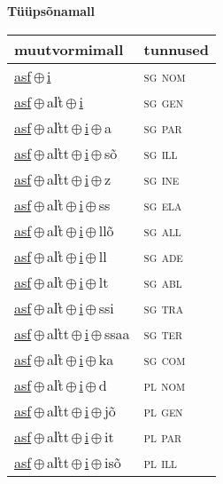 

\vspace{3.5em}
\noindent \begin{minipage}{\textwidth}
\noindent \textbf{Tüüpsõnamall \,}\\

\begin{sideways}
\begin{tabular}{l l}
muutvormimall & tunnused \\
\hline
\underline{asf}\,$\oplus$\,\underline{i} & \textsc{ sg nom } \\
\underline{asf}\,$\oplus$\,al̕t\,$\oplus$\,\underline{i} & \textsc{ sg gen } \\
\underline{asf}\,$\oplus$\,al̕tt\,$\oplus$\,\underline{i}\,$\oplus$\,a & \textsc{ sg par } \\
\underline{asf}\,$\oplus$\,al̕tt\,$\oplus$\,\underline{i}\,$\oplus$\,sõ & \textsc{ sg ill } \\
\underline{asf}\,$\oplus$\,al̕tt\,$\oplus$\,\underline{i}\,$\oplus$\,z & \textsc{ sg ine } \\
\underline{asf}\,$\oplus$\,al̕t\,$\oplus$\,\underline{i}\,$\oplus$\,ss & \textsc{ sg ela } \\
\underline{asf}\,$\oplus$\,al̕t\,$\oplus$\,\underline{i}\,$\oplus$\,llõ & \textsc{ sg all } \\
\underline{asf}\,$\oplus$\,al̕t\,$\oplus$\,\underline{i}\,$\oplus$\,ll & \textsc{ sg ade } \\
\underline{asf}\,$\oplus$\,al̕t\,$\oplus$\,\underline{i}\,$\oplus$\,lt & \textsc{ sg abl } \\
\underline{asf}\,$\oplus$\,al̕t\,$\oplus$\,\underline{i}\,$\oplus$\,ssi & \textsc{ sg tra } \\
\underline{asf}\,$\oplus$\,al̕tt\,$\oplus$\,\underline{i}\,$\oplus$\,ssaa & \textsc{ sg ter } \\
\underline{asf}\,$\oplus$\,al̕t\,$\oplus$\,\underline{i}\,$\oplus$\,ka & \textsc{ sg com } \\
\underline{asf}\,$\oplus$\,al̕t\,$\oplus$\,\underline{i}\,$\oplus$\,d & \textsc{ pl nom } \\
\underline{asf}\,$\oplus$\,al̕tt\,$\oplus$\,\underline{i}\,$\oplus$\,jõ & \textsc{ pl gen } \\
\underline{asf}\,$\oplus$\,al̕tt\,$\oplus$\,\underline{i}\,$\oplus$\,it & \textsc{ pl par } \\
\underline{asf}\,$\oplus$\,al̕tt\,$\oplus$\,\underline{i}\,$\oplus$\,isõ & \textsc{ pl ill } \\

\end{tabular}
\end{sideways}
\end{minipage}
